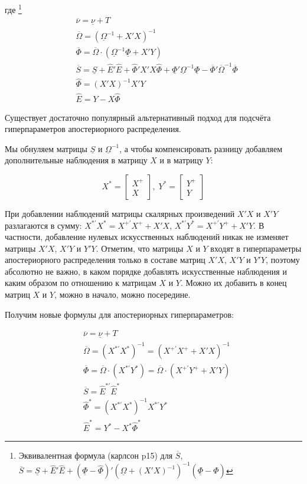 \documentclass[11pt]{article} %
\newcommand{\prior}{\underline}
\newcommand{\post}{\overline}
\begin{document}
где
\footnote{
Эквивалентная формула (карлсон p15) для $\post S$, 
$\post S=\prior S +\hat E'\hat E + (\prior \Phi - \hat \Phi)'(\prior \Omega + (X'X)^{-1})^{-1}(\prior \Phi - \hat \Phi)$
}
\begin{align*}
&\post\nu =\prior \nu+T\\
&\post{\Omega}=(\prior \Omega^{-1}+X'X)^{-1}\\
&\post \Phi=\post{\Omega}\cdot (\prior \Omega^{-1}\prior \Phi+X'Y)\\
&\post S=\prior S +\hat E'\hat E+\hat \Phi'
 X'X \hat \Phi +\prior \Phi'\prior\Omega^{-1}\prior \Phi-\post \Phi'\post\Omega^{-1}\post \Phi\\
&\hat\Phi=(X'X)^{-1}X'Y\\%
&\hat E=Y-X\hat\Phi
\end{align*}


Существует достаточно популярный альтернативный подход для подсчёта гиперпараметров апостериорного распределения.


Мы обнуляем матрицы  $\prior S$ и $\prior \Omega^{-1}$, а чтобы компенсировать разницу добавляем дополнительные наблюдения в матрицу $X$ и в матрицу $Y$: 

\[
X^*=\begin{bmatrix}
X^{+} \\
X 
\end{bmatrix}, \;
Y^*=\begin{bmatrix}
Y^{+} \\
Y 
\end{bmatrix}
\]

При добавлении наблюдений матрицы скалярных произведений $X'X$ и $X'Y$ разлагаются в сумму: $X^{*\prime}X^*=X^{+\prime}X^+ + X'X$, $X^{*\prime}Y^*=X^{+\prime}Y^+ + X'Y$. В частности, добавление нулевых искусственных наблюдений никак не изменяет матрицы $X'X$, $X'Y$ и $Y'Y$. Отметим, что матрицы $X$ и $Y$ входят в гиперпараметры апостериорного распределения только в составе матриц $X'X$, $X'Y$ и $Y'Y$, поэтому абсолютно не важно, в каком порядке добавлять искусственные наблюдения и каким образом по отношению к матрицам $X$ и $Y$. Можно их добавить в конец матриц $X$ и $Y$, можно в начало, можно посередине. 

Получим новые формулы для апостериорных гиперпараметров: \todo{Матрица $\post S$ пока не вывелась}


\begin{align*}
&\post\nu =\prior \nu+T\\
&\post{\Omega}=(X^{*\prime}X^*)^{-1}=(X^{+\prime}X^+ + X'X)^{-1}\\
&\post \Phi=\post{\Omega}\cdot (X^{*\prime}Y^*)=\post{\Omega}\cdot (X^{+\prime}Y^+ + X'Y)\\
&\post S=\hat E^{*\prime}\hat E^*\\
&\hat\Phi^*=(X^{*\prime}X^*)^{-1}X^{*\prime}Y^*\\
&\hat E^*=Y^*-X^*\hat\Phi^*
\end{align*}
\end{document}
